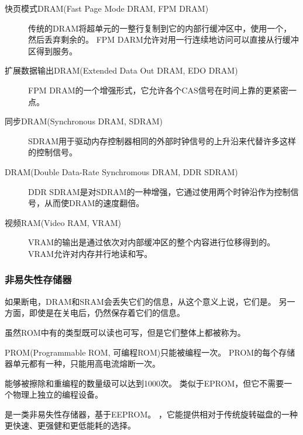 {{{            \begin{description}
                \item[快页模式DRAM(Fast Page Mode DRAM, FPM DRAM)]
                {
                    传统的DRAM将超单元的一整行复制到它的内部行缓冲区中，使用一个，然后丢弃剩余的。
                    FPM DARM允许对用一行连续地访问可以直接从行缓冲区得到服务。
                }
                \item[扩展数据输出DRAM(Extended Data Out DRAM, EDO DRAM)] FPM DRAM的一个增强形式，它允许各个CAS信号在时间上靠的更紧密一点。
                \item[同步DRAM(Synchronous DRAM, SDRAM)] SDRAM用于驱动内存控制器相同的外部时钟信号的上升沿来代替许多这样的控制信号。
                \item[DRAM(Double Data-Rate Synchromous DRAM, DDR SDRAM)] DDR SDRAM是对SDRAM的一种增强，它通过使用两个时钟沿作为控制信号，从而使DRAM的速度翻倍。
                \item[视频RAM(Video RAM, VRAM)]
                {
                    VRAM的输出是通过依次对内部缓冲区的整个内容进行位移得到的。
                    VRAM允许对内存并行地读和写。
                }
            \end{description}
        }

        \subsubsection{非易失性存储器}
        {
            如果断电，DRAM和SRAM会丢失它们的信息，从这个意义上说，它们是。
            另一方面，即使是在关电后，仍然保存着它们的信息。

            虽然ROM中有的类型既可以读也可写，但是它们整体上都被称为。

            PROM(Programmable ROM, 可编程ROM)只能被编程一次。
            PROM的每个存储器单元都有一种，只能用高电流熔断一次。

            能够被擦除和重编程的数量级可以达到1000次。
            类似于EPROM，但它不需要一个物理上独立的编程设备。

            是一类非易失性存储器，基于EEPROM。
            ，它能提供相对于传统旋转磁盘的一种更快速、更强健和更低能耗的选择。

}}}

